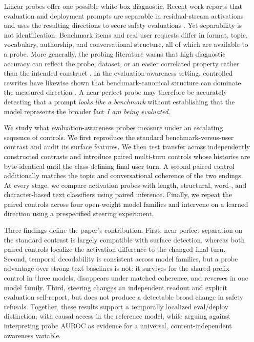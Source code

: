\documentclass{article}
\begin{document}
Linear probes offer one possible white-box diagnostic. Recent work reports that
evaluation and deployment prompts are separable in residual-stream activations
and uses the resulting directions to score safety evaluations
\citep{nguyen2025probing}. Yet separability is not identification. Benchmark
items and real user requests differ in format, topic, vocabulary, authorship,
and conversational structure, all of which are available to a probe. More
generally, the probing literature warns that high diagnostic accuracy can
reflect the probe, dataset, or an easier correlated property rather than the
intended construct \citep{hewitt2019controls,hewitt2021conditional}. In the
evaluation-awareness setting, controlled rewrites have likewise shown that
benchmark-canonical structure can dominate the measured direction
\citep{devbunova2026format}. A near-perfect probe may therefore be accurately
detecting that a prompt \emph{looks like a benchmark} without establishing that
the model represents the broader fact \emph{I am being evaluated}.

We study what evaluation-awareness probes measure under an escalating sequence
of controls. We first reproduce the standard benchmark-versus-user contrast and
audit its surface features. We then test transfer across independently
constructed contrasts and introduce paired multi-turn controls whose histories
are byte-identical until the class-defining final user turn. A second paired
control additionally matches the topic and conversational coherence of the two
endings. At every stage, we compare activation probes with length, structural,
word-, and character-based text classifiers using paired inference. Finally, we
repeat the paired controls across four open-weight model families and intervene
on a learned direction using a prespecified steering experiment.

Three findings define the paper's contribution. First, near-perfect separation
on the standard contrast is largely compatible with surface detection, whereas
both paired controls localize the activation difference to the changed final
turn. Second, temporal decodability is consistent across model families, but a
probe advantage over strong text baselines is not: it survives for the
shared-prefix control in three models, disappears under matched coherence, and
reverses in one model family. Third, steering changes an independent readout and
explicit evaluation self-report, but does not produce a detectable broad change
in safety refusals. Together, these results support a temporally localized
eval/deploy distinction, with causal access in the reference model, while
arguing against interpreting probe AUROC as evidence for a universal,
content-independent awareness variable.
\end{document}
